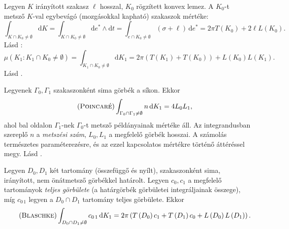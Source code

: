 \documentclass[%
	DIV=15,appendixprefix]{scrreprt}
\theoremstyle{definition}
\theoremstyle{remark}
\begin{document}
Legyen $ K $ irányított szakasz $ \ell $ hosszal, $ K_{ 0 } $ rögzített konvex lemez. A
$ K_{ 0 } $-t metsző $ K $-val egybevágó (mozgásokkal kapható) szakaszok mértéke:
\begin{equation*}
	\int_{ K \cap K_{ 0 } \neq
	\emptyset} \mathrm{ d } K = \int_{ K \cap K_{ 0 } \neq \emptyset} \mathrm{ d }e^{ * } \wedge
	\mathrm{ d } t = \int_{ e \cap K_{ 0 } \neq \emptyset} \left( \sigma + \ell \right) \, \mathrm{ d } e^{ * } = 2 \pi T \left( K_{ 0 } \right) + 2 \ell L \left( K_{ 0 } \right).
\end{equation*}
%
Lásd \cite[6.~fejezet, 5.~szakasz, 93--95.~oldal]{Santalo}:
\begin{equation*}
	\mu \left( K_{ 1 } \colon K_{ 1 } \cap K_{ 0 } \neq \emptyset \right) = \int_{ K_{ 1 } \cap
	K_{ 0 } \neq \emptyset } \mathrm{ d } K_{ 1 } = 2 \pi \left( T \left( K_{ 1 } \right) + T
	\left( K_{ 0 } \right) \right) + L \left( K_{ 0 } \right) L \left( K_{ 1 } \right).
\end{equation*}
%
Lásd \cite[7.~fejezet, 2.~szakasz, 111.~oldal]{Santalo}.

Legyenek $ \Gamma_{ 0 },{} \Gamma_{ 1 } $ szakaszonként sima görbék a síkon. Ekkor
\begin{equation}\tag{\textsc{Poincaré}}
	\int_{ \Gamma_{ 0 } \cap \Gamma_{ 1 } \neq \emptyset } n \, \mathrm{ d } K_{ 1 } = 4 L_{ 0 }
	L_{ 1 },
\end{equation}
ahol bal oldalon $ \Gamma_{ 1 } $-nek $ \Gamma_{ 0 } $-t metsző példányainak mértéke áll. Az
integrandusban szereplő $ n $ a \emph{metszési szám}, $ L_{ 0 },{} L_{ 1 } $ a megfelelő görbék
hosszai. A számolás természetes paraméterezésre, és az ezzel kapcsolatos mértékre történő áttéréssel
megy.
%
Lásd \cite[7.~fejezet, 4.~szakasz, 114.~oldal]{Santalo}.

Legyen $ D_{ 0 },{} D_{ 1 } $ két tartomány (összefüggő és nyílt), szakaszonként sima, irányított,
nem önátmetsző görbékkel határolt. Legyen $ c_{ 0 },{} c_{ 1 } $ a megfelelő tartományok
\emph{teljes görbülete} (a határgörbék görbületei integráljainak összege), míg $ c_{ 0\,1 } $ legyen
a $ D_{ 0 } \cap D_{ 1 } $ tartomány teljes görbülete. Ekkor
\begin{equation}\tag{\textsc{Blaschke}}
	\int_{ D_{ 0 } \cap D_{ 1 } \neq \emptyset } c_{ 0\,1 } \, \mathrm{ d } K_{ 1 } = 2 \pi \left(
	T \left( D_{ 0 } \right) c_{ 1 } + T \left( D_{ 1 } \right) c_{ 0 } + L \left( D_{ 0 } \right)
	L \left( D_{ 1 } \right) \right).
\end{equation}
%
%
%
\appendix
{}
%
\end{document}
